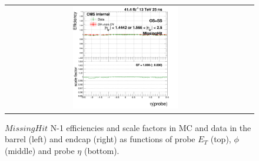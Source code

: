 \begin{figure}[bh]
\begin{center}
\begin{tabular}{cc}
      \includegraphics[width=0.45\textwidth]{figures/Zprime/2017/ScaleFactor/SameSign/N-1/g_compare_cut_eta_Barrel+Endcap_ea_ta_inc_AS_N_1_MissHit_PUW.png}
    \end{tabular}
    \caption{$MissingHit$ N-1 efficiencies and scale factors in MC and data in the barrel (left) and endcap (right) as functions of probe $E_T$ (top), $\phi$ (middle) and probe $\eta$ (bottom).}
    \label{fig:MissHit_2017}
  \end{center}
\end{figure}

